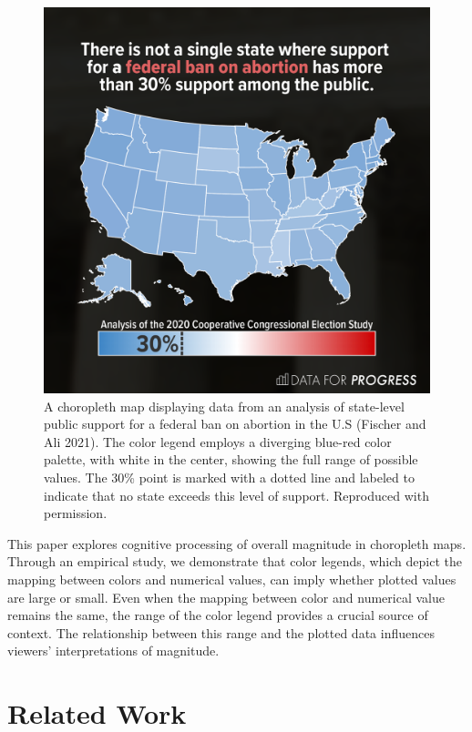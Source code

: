 \documentclass[
]{interact}
\begin{document}
\begin{figure}

{\centering \includegraphics[width=5in,height=\textheight]{examples/dfp.png}

}

\caption{\label{fig-DFP-example}A choropleth map displaying data from an
analysis of state-level public support for a federal ban on abortion in
the U.S (Fischer and Ali 2021). The color legend employs a diverging
blue-red color palette, with white in the center, showing the full range
of possible values. The 30\% point is marked with a dotted line and
labeled to indicate that no state exceeds this level of support.
Reproduced with permission.}

\end{figure}

This paper explores cognitive processing of overall magnitude in
choropleth maps. Through an empirical study, we demonstrate that color
legends, which depict the mapping between colors and numerical values,
can imply whether plotted values are large or small. Even when the
mapping between color and numerical value remains the same, the range of
the color legend provides a crucial source of context. The relationship
between this range and the plotted data influences viewers'
interpretations of magnitude.

\hypertarget{related-work}{%
\section{Related Work}\label{related-work}}
\end{document}
